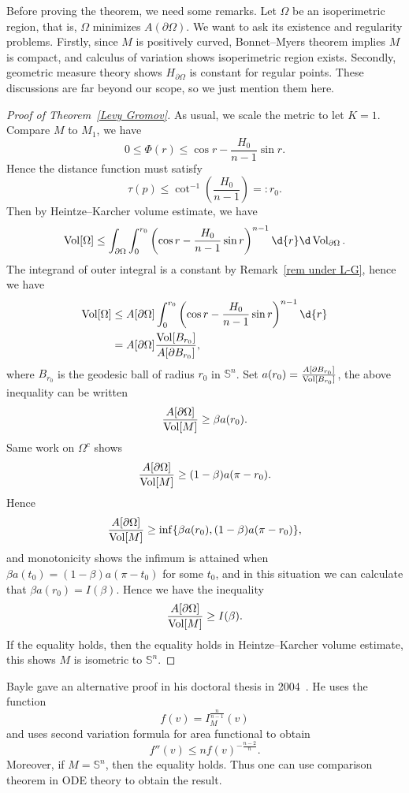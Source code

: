 \begin{rem}\label{rem under L-G}
    Before proving the theorem, we need some remarks.
    Let $\Omega$ be an isoperimetric region, that is, $\Omega$ minimizes $A(\partial\Omega)$.
    We want to ask its existence and regularity problems.
    Firstly, since $M$ is positively curved, Bonnet--Myers theorem implies $M$ is compact, and calculus of variation shows isoperimetric region exists.
    Secondly, geome\-tric measure theory shows $H_{\partial\Omega}$ is constant for regular points.
    These discussions are far beyond our scope, so we just mention them here.
\end{rem}

\begin{proof}[Proof of Theorem~\ref{Levy Gromov}]
    As usual, we scale the metric to let $K=1$.
    Compare $M$ to $M_1$, we have
    \[0\leq\Phi(r)\leq\cos{r}-\frac{H_0}{n-1}\sin{r}.\]
    Hence the distance function must satisfy
    \[\tau(p)\leq\cot^{-1}\left(\frac{H_0}{n-1}\right)=:r_0.\]
    Then by Heintze--Karcher volume estimate, we have
    \[\Vol[\Omega]\leq\int_{\partial\Omega}\int_0^{r_0}\left(\cos{r}-\frac{H_0}{n-1}\sin{r}\right)^{n-1}\d{r}\d\Vol_{\partial\Omega}.\]
    The integrand of outer integral is a constant by Remark~\ref{rem under L-G}, hence we have
    \begin{align*}
        \Vol[\Omega]&\leq A[\partial\Omega]\int_{0}^{r_0}\left(\cos{r}-\frac{H_0}{n-1}\sin{r}\right)^{n-1}\d{r}\\
        &=A[\partial\Omega]\frac{\Vol[B_{r_0}]}{A[\partial B_{r_0}]},
    \end{align*}
    where $B_{r_0}$ is the geodesic ball of radius $r_0$ in $\mathbb{S}^n$.
    Set $a(r_0)=\frac{A[\partial B_{r_0}]}{\operatorname{Vol}[B_{r_0}]}$, the above inequality can be written
    \[\frac{A[\partial\Omega]}{\operatorname{Vol}[M]}\geq\beta a(r_0).\]
    Same work on $\Omega^c$ shows
    \[\frac{A[\partial\Omega]}{\operatorname{Vol}[M]}\geq(1-\beta)a(\pi-r_0).\]
    Hence
    \[\frac{A[\partial\Omega]}{\operatorname{Vol}[M]}\geq\inf\{\beta a(r_0),(1-\beta)a(\pi-r_0)\},\]
    and monotonicity shows the infimum is attained when $\beta a(t_0)=(1-\beta)a(\pi-t_0)$ for some $t_0$, and in this situation we can calculate that $\beta a(r_0)=I(\beta)$.
    Hence we have the inequality
    \[\frac{A[\partial\Omega]}{\operatorname{Vol}[M]}\geq I(\beta).\]
    If the equality holds, then the equality holds in Heintze--Karcher volume estimate, this shows $M$ is isometric to $\mathbb{S}^n$.
\end{proof}

\begin{rem}
    Bayle gave an alternative proof in his doctoral thesis in 2004~\cite{Bayle}.
    He uses the function
    \[f(v)=I^{\frac{n}{n-1}}_M(v)\]
    and uses second variation formula for area functional to obtain
    \[f''(v)\leq nf(v)^{-\frac{n-2}{n}}.\]
    Moreover, if $M=\mathbb{S}^n$, then the equality holds.
    Thus one can use comparison theorem in ODE theory to obtain the result.

\end{rem}

